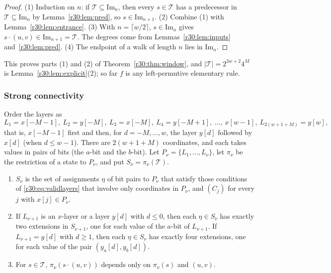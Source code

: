 \begin{proof}
(1) Induction on $n$: if $\mathcal{T}\subseteq\mathrm{Im}_n$, then every $s\in\mathcal{T}$ has a predecessor in $\mathcal{T}\subseteq\mathrm{Im}_n$ by Lemma~\ref{r30:lem:pred}, so $s\in\mathrm{Im}_{n+1}$. (2) Combine (1) with Lemma~\ref{r30:lem:entrance}. (3) With $n=\lceil w/2\rceil$, $s\in\mathrm{Im}_n$ gives $s\cdot(u,v)\in\mathrm{Im}_{n+1}=\mathcal{T}$. The degrees come from Lemmas~\ref{r30:lem:inputs} and~\ref{r30:lem:pred}. (4) The endpoint of a walk of length $n$ lies in $\mathrm{Im}_n$.
\end{proof}

This proves parts (1) and (2) of Theorem~\ref{r30:thm:window}, and $|\mathcal{T}|=2^{3w+2}4^M$ is Lemma~\ref{r30:lem:explicit}(2); so far $f$ is any left-permutive elementary rule.

\subsubsection*{Strong connectivity}
Order the layers as
\[
L_1=x[-M-1],\ L_2=y[-M],\ L_3=x[-M],\ L_4=y[-M+1],\ \dots,\ x[w-1],\ L_{2(w+1+M)}=y[w],
\]
that is, $x[-M-1]$ first and then, for $d=-M,\dots,w$, the layer $y[d]$ followed by $x[d]$ (when $d\le w-1$). There are $2(w+1+M)$ coordinates, and each takes values in pairs of bits (the $a$-bit and the $b$-bit). Let $P_\nu=\{L_1,\dots,L_\nu\}$, let $\pi_\nu$ be the restriction of a state to $P_\nu$, and put $S_\nu=\pi_\nu(\mathcal{T})$.

\begin{lemma}\label{r30:lem:tower}
\begin{enumerate}
\item $S_\nu$ is the set of assignments $\eta$ of bit pairs to $P_\nu$ that satisfy those conditions of \eqref{r30:eq:validlayers} that involve only coordinates in $P_\nu$, and $(C_j)$ for every $j$ with $x[j]\in P_\nu$.
\item If $L_{\nu+1}$ is an $x$-layer or a layer $y[d]$ with $d\le0$, then each $\eta\in S_\nu$ has exactly two extensions in $S_{\nu+1}$, one for each value of the $a$-bit of $L_{\nu+1}$. If $L_{\nu+1}=y[d]$ with $d\ge1$, then each $\eta\in S_\nu$ has exactly four extensions, one for each value of the pair $(y_a[d],y_b[d])$.
\item For $s\in\mathcal{T}$, $\pi_\nu(s\cdot(u,v))$ depends only on $\pi_\nu(s)$ and $(u,v)$.
\end{enumerate}
\end{lemma}


